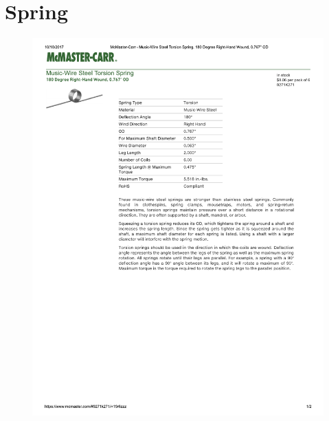 \documentclass[../main.tex]{subfiles}
\begin{document}
\section{Spring \cite{TORSIONSPRING}} \label{TorsionSpring} \label{TORSIONSPRING}
\begin{figure}[H]
	\centering
	\includegraphics[width=\textwidth]{img/specs/Torsion-Spring.pdf}
\end{figure}

\end{document}
